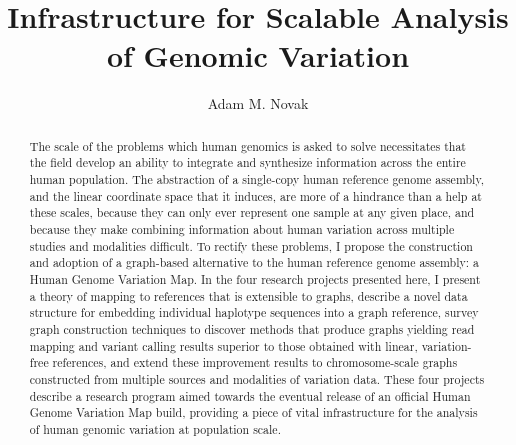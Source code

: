 
\title{Infrastructure for Scalable Analysis of Genomic Variation}
\author{Adam M. Novak}
\deanlinethree{}

\begin{frontmatter}

\maketitle
\copyrightpage

\tableofcontents
\listoffigures
\listoftables
\listofalgorithms
{}

\begin{abstract}
The scale of the problems which human genomics is asked to solve necessitates that the field develop an ability to integrate and synthesize information across the entire human population. The abstraction of a single-copy human reference genome assembly, and the linear coordinate space that it induces, are more of a hindrance than a help at these scales, because they can only ever represent one sample at any given place, and because they make combining information about human variation across multiple studies and modalities difficult. To rectify these problems, I propose the construction and adoption of a graph-based alternative to the human reference genome assembly: a Human Genome Variation Map. In the four research projects presented here, I present a theory of mapping to references that is extensible to graphs, describe a novel data structure for embedding individual haplotype sequences into a graph reference, survey graph construction techniques to discover methods that produce graphs yielding read mapping and variant calling results superior to those obtained with linear, variation-free references, and extend these improvement results to chromosome-scale graphs constructed from multiple sources and modalities of variation data. These four projects describe a research program aimed towards the eventual release of an official Human Genome Variation Map build, providing a piece of vital infrastructure for the analysis of human genomic variation at population scale.
\end{abstract}


\end{frontmatter}
